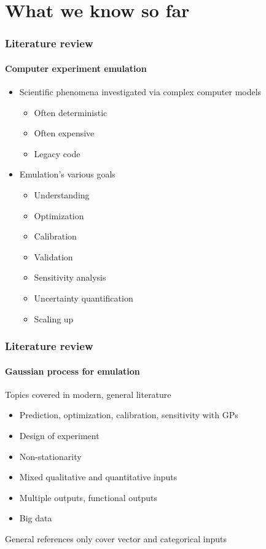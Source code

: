 \documentclass{snedecorbeamer}
\begin{document}
\section{What we know so far}

\begin{frame}
  \frametitle{Literature review}
  \framesubtitle{Computer experiment emulation}

  \begin{itemize}
  \item<2-> Scientific phenomena investigated via complex computer models
    \begin{itemize}
    \item Often deterministic
    \item Often expensive
    \item Legacy code
    \end{itemize}
  \item<3-> Emulation's various
    goals\citep{sacks1989,jones1998,currin1991,koehler1996}
    \begin{itemize}
    \item Understanding
    \item Optimization~\citep{jones1998,ohagan1992}
    \item Calibration~\citep{higdon2008,higdon2008a,kennedy2001}
    \item Validation~\citep{bayarri2007}
    \item Sensitivity analysis
    \item Uncertainty quantification
    \item Scaling up
    \end{itemize}
  \end{itemize}
\end{frame}

\begin{frame}
  \frametitle{Literature review}
  \framesubtitle{Gaussian process for emulation}

  Topics covered in modern, general literature \citep{santner2003,santner2018,gramacy2020}
  \begin{itemize}
  \item Prediction, optimization, calibration, sensitivity with GPs
  \item Design of experiment
  \item Non-stationarity
  \item Mixed qualitative and quantitative inputs
  \item Multiple outputs, functional outputs
  \item Big data
  \end{itemize}

  \vfill{}
  \begin{exampleblock}{}
    General references only cover vector and categorical inputs
  \end{exampleblock}
\end{frame}
\end{document}
